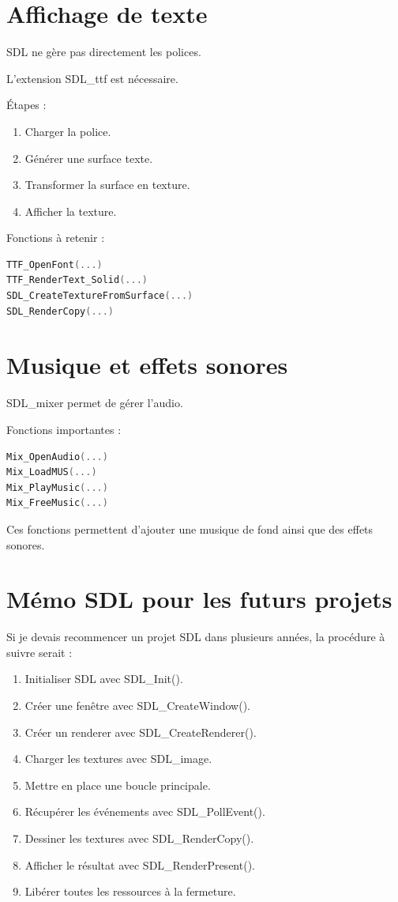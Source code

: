 \documentclass[a4paper,11pt]{article}
\begin{document}
\section{Affichage de texte}

SDL ne gère pas directement les polices.

L'extension SDL\_ttf est nécessaire.

Étapes :

\begin{enumerate}
    \item Charger la police.
    \item Générer une surface texte.
    \item Transformer la surface en texture.
    \item Afficher la texture.
\end{enumerate}

Fonctions à retenir :

\begin{lstlisting}[language=C]
TTF_OpenFont(...)
TTF_RenderText_Solid(...)
SDL_CreateTextureFromSurface(...)
SDL_RenderCopy(...)
\end{lstlisting}

\section{Musique et effets sonores}

SDL\_mixer permet de gérer l'audio.

Fonctions importantes :

\begin{lstlisting}[language=C]
Mix_OpenAudio(...)
Mix_LoadMUS(...)
Mix_PlayMusic(...)
Mix_FreeMusic(...)
\end{lstlisting}

Ces fonctions permettent d'ajouter une musique de fond ainsi que des effets sonores.

\section{Mémo SDL pour les futurs projets}

Si je devais recommencer un projet SDL dans plusieurs années, la procédure à suivre serait :

\begin{enumerate}
    \item Initialiser SDL avec SDL\_Init().
    \item Créer une fenêtre avec SDL\_CreateWindow().
    \item Créer un renderer avec SDL\_CreateRenderer().
    \item Charger les textures avec SDL\_image.
    \item Mettre en place une boucle principale.
    \item Récupérer les événements avec SDL\_PollEvent().
    \item Dessiner les textures avec SDL\_RenderCopy().
    \item Afficher le résultat avec SDL\_RenderPresent().
    \item Libérer toutes les ressources à la fermeture.
\end{enumerate}
\end{document}
